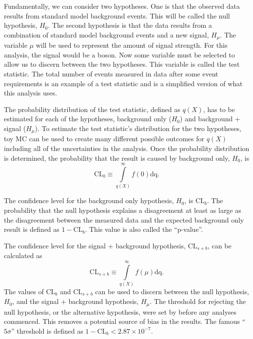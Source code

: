 Fundamentally, we can consider two hypotheses. One is that the observed data results from standard model background events. This will be called the null hypothesis, $H_{0}$. The second hypothesis is that the data results from a combination of standard model background events and a new signal, $H_{\mu}$. The variable $\mu$ will be used to represent the amount of signal strength. For this analysis, the signal would be a \WR boson. Now some variable must be selected to allow us to discern between the two hypotheses. This variable is called the test statistic. The total number of events measured in data after some event requirements is an example of a test statistic and is a simplified version of what this analysis uses.

The probability distribution of the test statistic, defined as $q\left(X\right)$, has to be estimated for each of the hypotheses, background only ($H_{0}$) and background + signal ($H_{\mu}$). To estimate the test statistic's distribution for the two hypotheses, toy MC can be used to create many different possible outcomes for $q\left(X\right)$ including all of the uncertainties in the analysis. Once the probability distribution is determined, the probability that the result is caused by background only, $H_{0}$, is
\begin{equation}
    \mathrm{CL}_{b}
    \equiv
    \int\limits_{q\left(X\right)}^{\infty}f\left(0\right)\mathrm{dq}.
\end{equation}

The confidence level for the background only hypothesis, $H_{0}$, is $\mathrm{CL}_{b}$. The probability that the null hypothesis explains a disagreement at least as large as the disagreement between the measured data and the expected background only result is defined as $1-\mathrm{CL}_{b}$. This value is also called the ``p-value''.

The confidence level for the signal + background hypothesis, $\mathrm{CL}_{s+b}$, can be calculated as
\begin{equation}
    \mathrm{CL}_{s+b}
    \equiv
    \int\limits_{q\left(X\right)}^{\infty}f\left(\mu\right)\mathrm{dq}.
\end{equation}
The values of $\mathrm{CL}_{b}$ and $\mathrm{CL}_{s+b}$ can be used to discern between the null hypothesis, $H_{0}$, and the signal + background hypothesis, $H_{\mu}$. The threshold for rejecting the null hypothesis, or the alternative hypothesis, were set by \CMS before any analyses commenced. This removes a potential source of bias in the results. The famous ``$5\sigma$'' threshold is defined as $1-\mathrm{CL}_{b} < 2.87\times10^{-7}$.

